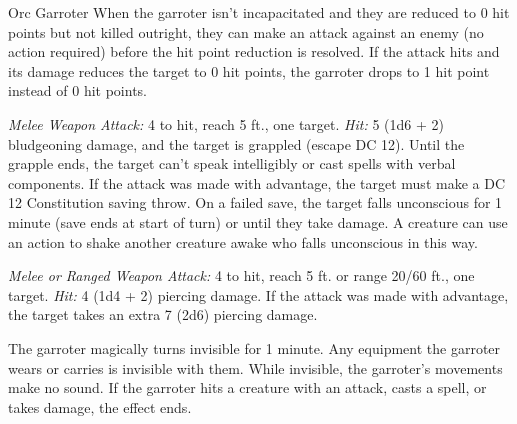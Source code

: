 \documentclass[10pt,a4paper,twoside,bg=print,twocolumn,openany,nodeprecatedcode]{dndbook}
\begin{document}
\begin{DndMonster}[float=t]{Orc Garroter}
\DndMonsterBasics[
armor-class = {14 (studded leather armor)},
hit-points = {\DndDice{4d8 + 12}},
speed = {35 ft.}
]
\DndMonsterAbilityScores[
 str = 15,
 dex = 14,
 con = 16,
 int = 10,
 wis = 12,
 cha = 9
]
\DndMonsterDetails[
saving-throws = {Dex +4},
skills = {Athletics +4, Stealth +6},
senses = {darkvision 60 ft., passive perception 11},
languages = {Common, Orc},
challenge = 1,
]
When the garroter isn't incapacitated and they are reduced to 0 hit points but not killed outright, they can make an attack against an enemy (no action required) before the hit point reduction is resolved. If the attack hits and its damage reduces the target to 0 hit points, the garroter drops to 1 hit point instead of 0 hit points.

\textsl{Melee Weapon Attack:} 4 to hit, reach 5 ft., one target. \textsl{Hit:} 5 (1d6 + 2) bludgeoning damage, and the target is grappled (escape DC 12). Until the grapple ends, the target can't speak intelligibly or cast spells with verbal components. If the attack was made with advantage, the target must make a DC 12 Constitution saving throw. On a failed save, the target falls unconscious for 1 minute (save ends at start of turn) or until they take damage. A creature can use an action to shake another creature awake who falls unconscious in this way.

\textsl{Melee or Ranged Weapon Attack:} 4 to hit, reach 5 ft. or range 20/60 ft., one target. \textsl{Hit:} 4 (1d4 + 2) piercing damage. If the attack was made with advantage, the target takes an extra 7 (2d6) piercing damage.

The garroter magically turns invisible for 1 minute. Any equipment the garroter wears or carries is invisible with them. While invisible, the garroter's movements make no sound. If the garroter hits a creature with an attack, casts a spell, or takes damage, the effect ends.

\end{DndMonster}
\end{document}
